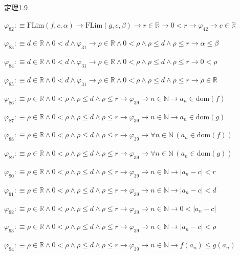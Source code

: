 \begin{fullproof}{定理1.9}
\begin{abbrevlist}
\item $\varphi_{82} :\equiv \mathrm{FLim}(f,c,\alpha) \to \mathrm{FLim}(g,c,\beta) \to r \in \mathbb{R} \to 0 < r \to \varphi_{42} \to c \in \mathbb{R}$
\item $\varphi_{83} :\equiv d \in \mathbb{R} \land 0 < d \land \varphi_{31} \to \rho \in \mathbb{R} \land 0 < \rho \land \rho \leq d \land \rho \leq r \to \alpha \leq \beta$
\item $\varphi_{84} :\equiv d \in \mathbb{R} \land 0 < d \land \varphi_{31} \to \rho \in \mathbb{R} \land 0 < \rho \land \rho \leq d \land \rho \leq r \to 0 < \rho$
\item $\varphi_{85} :\equiv d \in \mathbb{R} \land 0 < d \land \varphi_{31} \to \rho \in \mathbb{R} \land 0 < \rho \land \rho \leq d \land \rho \leq r \to \rho \in \mathbb{R}$
\item $\varphi_{86} :\equiv \rho \in \mathbb{R} \land 0 < \rho \land \rho \leq d \land \rho \leq r \to \varphi_{39} \to n \in \mathbb{N} \to a_{n} \in \mathrm{dom}(f)$
\item $\varphi_{87} :\equiv \rho \in \mathbb{R} \land 0 < \rho \land \rho \leq d \land \rho \leq r \to \varphi_{39} \to n \in \mathbb{N} \to a_{n} \in \mathrm{dom}(g)$
\item $\varphi_{88} :\equiv \rho \in \mathbb{R} \land 0 < \rho \land \rho \leq d \land \rho \leq r \to \varphi_{39} \to \forall n \in \mathbb{N}\,(a_{n} \in \mathrm{dom}(f))$
\item $\varphi_{89} :\equiv \rho \in \mathbb{R} \land 0 < \rho \land \rho \leq d \land \rho \leq r \to \varphi_{39} \to \forall n \in \mathbb{N}\,(a_{n} \in \mathrm{dom}(g))$
\item $\varphi_{90} :\equiv \rho \in \mathbb{R} \land 0 < \rho \land \rho \leq d \land \rho \leq r \to \varphi_{39} \to n \in \mathbb{N} \to \lvert a_{n} - c \rvert < r$
\item $\varphi_{91} :\equiv \rho \in \mathbb{R} \land 0 < \rho \land \rho \leq d \land \rho \leq r \to \varphi_{39} \to n \in \mathbb{N} \to \lvert a_{n} - c \rvert < d$
\item $\varphi_{92} :\equiv \rho \in \mathbb{R} \land 0 < \rho \land \rho \leq d \land \rho \leq r \to \varphi_{39} \to n \in \mathbb{N} \to 0 < \lvert a_{n} - c \rvert$
\item $\varphi_{93} :\equiv \rho \in \mathbb{R} \land 0 < \rho \land \rho \leq d \land \rho \leq r \to \varphi_{39} \to n \in \mathbb{N} \to \lvert a_{n} - c \rvert < \rho$
\item $\varphi_{94} :\equiv \rho \in \mathbb{R} \land 0 < \rho \land \rho \leq d \land \rho \leq r \to \varphi_{39} \to n \in \mathbb{N} \to f(a_{n}) \leq g(a_{n})$

\end{abbrevlist}
\end{fullproof}
